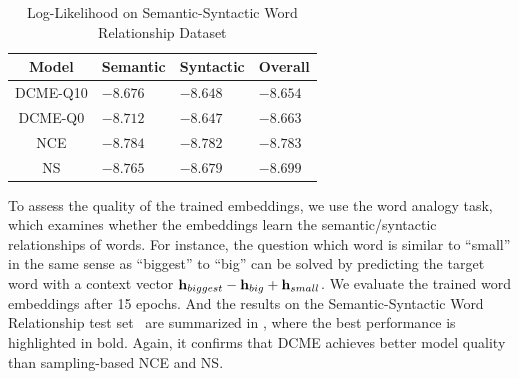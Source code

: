 \begin{table}[h]
  \centering
  \begin{tabular}{c||l|l|l}
    Model     & Semantic          & Syntactic         & Overall          \\
    \hline\hline
    DCME-Q10  & $\mathbf{-8.676}$ & $-8.648$          & $\mathbf{-8.654}$ \\
    DCME-Q0   & $-8.712$          & $\mathbf{-8.647}$ & $-8.663$          \\
    NCE       & $-8.784$          & $-8.782$          & $-8.783$          \\
    NS        & $-8.765$          & $-8.679$          & $-8.699$          \\
  \end{tabular}
  \captionsetup{justification=centering}
  \caption{Log-Likelihood on Semantic-Syntactic Word Relationship Dataset}
  \label{tab::we_analogy}
\end{table}

To assess the quality of the trained embeddings, we use the word analogy task,
which examines whether the embeddings learn the semantic/syntactic relationships
of words. For instance, the question which word is similar to ``small'' in the
same sense as ``biggest'' to ``big'' can be solved by predicting the target word
with a context vector $\mathbf{h}_{biggest} - \mathbf{h}_{big} + \mathbf{h}_{small}$. We evaluate the
trained word embeddings after 15 epochs. And the results on the
Semantic-Syntactic Word Relationship test set~\cite{mikolov2013efficient} are
summarized in , where the best performance is highlighted
in bold. Again, it confirms that DCME achieves better model quality than
sampling-based NCE and NS.


